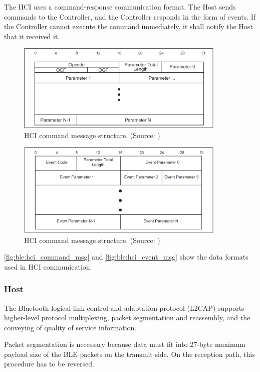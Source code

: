 The HCI uses a command-response communication format.
The Host sends commands to the Controller, and the Controller responds in the form of events.
If the Controller cannot execute the command immediately, it shall notify the Host that it received it.

\begin{figure}[!ht]
    \centering
    \includegraphics[width=100mm, keepaspectratio]{figures/hci_command_msg.png}
    \caption{HCI command message structure. (Source: \cite{bt5})}
    \label{fig:ble:hci_command_msg}
\end{figure}

\begin{figure}[!ht]
    \centering
    \includegraphics[width=100mm, keepaspectratio]{figures/hci_event_msg.png}
    \caption{HCI command message structure. (Source: \cite{bt5})}
    \label{fig:ble:hci_event_msg}
\end{figure}

\autoref{fig:ble:hci_command_msg} and \autoref{fig:ble:hci_event_msg} show the data formats used in HCI communication.

\subsubsection{Host}
\label{ble:host}
The Bluetooth logical link control and adaptation protocol (L2CAP)
supports higher-level protocol multiplexing, packet segmentation and
reassembly, and the conveying of quality of service information.

Packet segmentation is necessary because data must fit into 27-byte maximum
payload size of the BLE packets on the transmit side. \cite{Townsend14}
On the reception path, this procedure has to be reversed.

